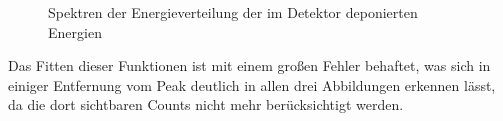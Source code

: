 \begin{figure}[htbp]
                    \caption{Spektren der Energieverteilung der im Detektor deponierten Energien}
                    \label{spektren}
                \end{figure}
                Das Fitten dieser Funktionen ist mit einem großen Fehler behaftet, was sich in einiger Entfernung vom Peak deutlich in allen drei Abbildungen erkennen lässt, da die dort sichtbaren Counts nicht mehr berücksichtigt werden.
